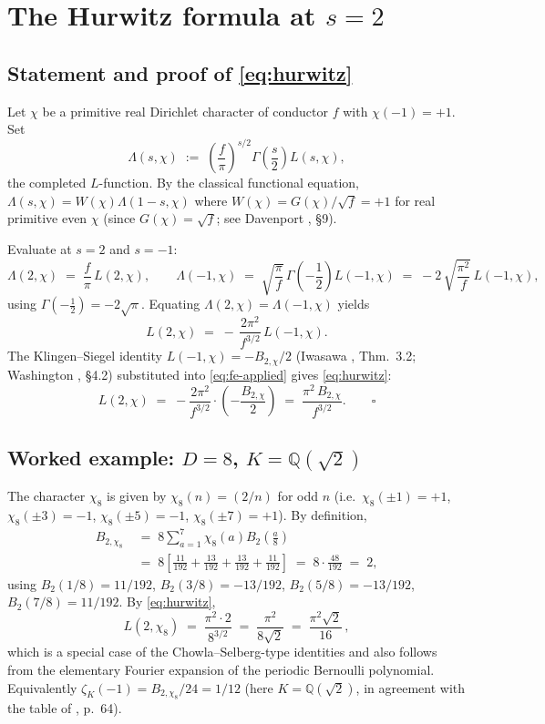 \documentclass[11pt,reqno]{amsart}
\theoremstyle{plain}
\theoremstyle{definition}
\newcommand{\Q}{\mathbb{Q}}
\begin{document}
\section{The Hurwitz formula at $s=2$}\label{sec:hurwitz}

\subsection{Statement and proof of \eqref{eq:hurwitz}}
Let $\chi$ be a primitive real Dirichlet character of conductor $f$
with $\chi(-1)=+1$.  Set
\[
\Lambda(s,\chi)\;:=\;\left(\frac{f}{\pi}\right)^{s/2}\Gamma\!\left(\frac{s}{2}\right)L(s,\chi),
\]
the completed $L$-function.  By the classical functional equation,
$\Lambda(s,\chi)=W(\chi)\Lambda(1-s,\chi)$ where
$W(\chi)=G(\chi)/\sqrt{f}=+1$ for real primitive even $\chi$ (since
$G(\chi)=\sqrt{f}$; see Davenport \cite{Davenport2000}, \S 9).

Evaluate at $s=2$ and $s=-1$:
\[
\Lambda(2,\chi)\;=\;\frac{f}{\pi}\,L(2,\chi),\qquad
\Lambda(-1,\chi)\;=\;\sqrt{\frac{\pi}{f}}\,\Gamma\!\left(-\frac{1}{2}\right)L(-1,\chi)\;=\;
-2\,\sqrt{\frac{\pi^{2}}{f}}\,L(-1,\chi),
\]
using $\Gamma(-\frac{1}{2})=-2\sqrt{\pi}$.  Equating
$\Lambda(2,\chi)=\Lambda(-1,\chi)$ yields
\begin{equation}\label{eq:fe-applied}
L(2,\chi)\;=\;-\,\frac{2\pi^{2}}{f^{3/2}}\,L(-1,\chi).
\end{equation}
The Klingen--Siegel identity $L(-1,\chi)=-B_{2,\chi}/2$ (Iwasawa
\cite{Iwasawa1972}, Thm.~3.2; Washington \cite{Washington1997},
\S 4.2) substituted into \eqref{eq:fe-applied} gives
\eqref{eq:hurwitz}:
\[
L(2,\chi)\;=\;-\frac{2\pi^{2}}{f^{3/2}}\cdot\left(-\frac{B_{2,\chi}}{2}\right)\;=\;
\frac{\pi^{2}\,B_{2,\chi}}{f^{3/2}}.\qquad\square
\]
\subsection{Worked example: $D=8$, $K=\Q(\sqrt 2)$}\label{ssec:D8-example}
The character $\chi_{8}$ is given by $\chi_{8}(n)=(2/n)$ for odd $n$
(i.e.\ $\chi_{8}(\pm 1)=+1$, $\chi_{8}(\pm 3)=-1$,
$\chi_{8}(\pm 5)=-1$, $\chi_{8}(\pm 7)=+1$).  By definition,
\begin{align*}
B_{2,\chi_{8}}\;&=\;8\sum_{a=1}^{7}\chi_{8}(a)B_{2}\!\left(\frac{a}{8}\right)\\
\;&=\;8\left[\frac{11}{192}+\frac{13}{192}+\frac{13}{192}+\frac{11}{192}\right]\;=\;8\cdot\frac{48}{192}\;=\;2,
\end{align*}
using
$B_{2}(1/8)=11/192$, $B_{2}(3/8)=-13/192$, $B_{2}(5/8)=-13/192$,
$B_{2}(7/8)=11/192$.  By \eqref{eq:hurwitz},
\[
L(2,\chi_{8})\;=\;\frac{\pi^{2}\cdot 2}{8^{3/2}}\;=\;\frac{\pi^{2}}{8\sqrt 2}\;=\;\frac{\pi^{2}\sqrt 2}{16}\,,
\]
which is a special case of the Chowla--Selberg-type identities and
also follows from the elementary Fourier expansion of the periodic
Bernoulli polynomial.  Equivalently $\zeta_{K}(-1)=B_{2,\chi_{8}}/24=1/12$
(here $K=\Q(\sqrt 2)$, in agreement with the table of
\cite{Zagier1976}, p.~64).
\end{document}
